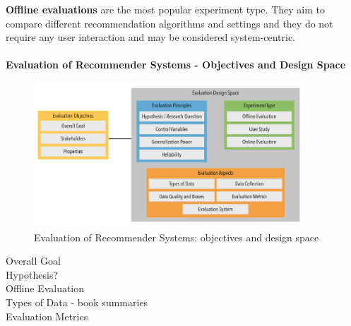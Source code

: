 \documentclass[\myFontSize,oneside,english,hidelinks,a4paper]{article}
\begin{document}
%
%
\textbf{Offline evaluations} are the most popular experiment type. They aim to compare different recommendation algorithms and settings and they do not require any user interaction and may be considered system-centric.  \cite{Zangerle2023}\\\\
%
%

%
%
\newpage{}
\textbf{Evaluation of Recommender Systems - Objectives and Design Space}
\begin{figure}[h!]
    \centering
    \includegraphics[width=0.9\textwidth]{img/evaluation_figure.png}
    \caption{Evaluation of Recommender Systems: objectives and design space \cite{Zangerle2023}}
    \label{fig:evaluation}
\end{figure}
%

Overall Goal\\
Hypothesis?\\
Offline Evaluation\\
Types of Data - book summaries\\
Evaluation Metrics\\


\clearpage
\thispagestyle{empty}
\mbox{}



\end{document}
